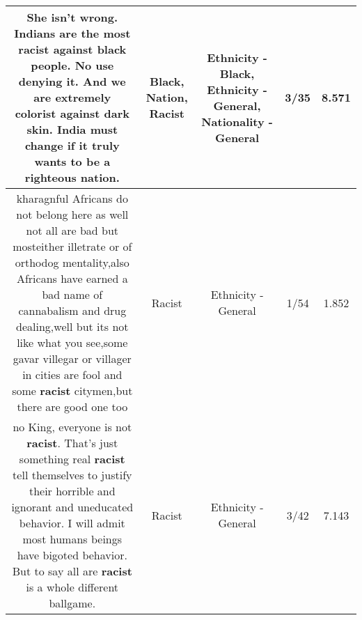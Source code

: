 \documentclass[11pt]{article}
\newlength\mylength
\begin{document}
\begin{center}
\begin{longtable}{|C{.65\mylength}|C{.30\mylength}|C{.12\mylength}|C{.12\mylength}|C{.12\mylength}|}
  \small She isn't wrong. Indians are the most \textbf{racist} against \textbf{black} people. No use denying it. And we are extremely colorist against dark skin. India must change if it truly wants to be a righteous \textbf{nation}.\normalsize   & Black, Nation, Racist & Ethnicity - Black, Ethnicity - General, Nationality - General & 3/35 & 8.571 \\  \hline
  \small kharagnful Africans do not belong here as well not all are bad but mosteither illetrate or of orthodog mentality,also Africans have earned a bad name of cannabalism and drug dealing,well but its not like what you see,some gavar villegar or villager in cities are fool and some \textbf{racist} citymen,but there are good one too\normalsize   & Racist & Ethnicity - General & 1/54 & 1.852 \\  \hline
  \small no King, everyone is not \textbf{racist}. That's just something real \textbf{racist} tell themselves to justify their horrible and ignorant and uneducated behavior. I will admit most humans beings have bigoted behavior. But to say all are \textbf{racist} is a whole different ballgame.\normalsize   & Racist & Ethnicity - General & 3/42 & 7.143 \\  \hline

\end{longtable}
\end{center}
\end{document}
